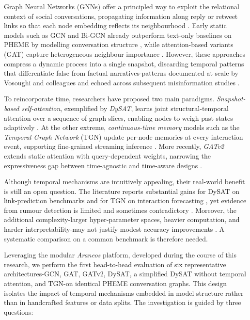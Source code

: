 \documentclass{cshonours}
\begin{document}
Graph Neural Networks (GNNs) offer a principled way to exploit the relational context of social conversations, propagating information along reply or retweet links so that each node embedding reflects its neighbourhood \cite{kipf2017semi}.  Early static models such as GCN and Bi-GCN already outperform text-only baselines on PHEME by modelling conversation structure \cite{bian2020rumor}, while attention-based variants (GAT) capture heterogeneous neighbour importance \cite{lv2022rumor}.  However, these approaches compress a dynamic process into a single snapshot, discarding temporal patterns that differentiate false from factual narratives-patterns documented at scale by Vosoughi and colleagues \cite{vosoughi2018spread} and echoed across subsequent misinformation studies \cite{survey2024disinfo}.


To reincorporate time, researchers have proposed two main paradigms.  \emph{Snapshot-based self-attention}, exemplified by \emph{DySAT}, learns joint structural-temporal attention over a sequence of graph slices, enabling nodes to weigh past states adaptively \cite{sankar2020dysat}.  At the other extreme, \emph{continuous-time memory} models such as the \emph{Temporal Graph Network} (TGN) update per-node memories at every interaction event, supporting fine-grained streaming inference \cite{rossi2020tgn}.  More recently, \emph{GATv2} extends static attention with query-dependent weights, narrowing the expressiveness gap between time-agnostic and time-aware designs \cite{brody2022gatv2}.


Although temporal mechanisms are intuitively appealing, their real-world benefit is still an open question.  The literature reports substantial gains for DySAT on link-prediction benchmarks \cite{sankar2020dysat} and for TGN on interaction forecasting \cite{rossi2020tgn}, yet evidence from rumour detection is limited and sometimes contradictory \cite{liu2024rumor}.  Moreover, the additional complexity-larger hyper-parameter spaces, heavier computation, and harder interpretability-may not justify modest accuracy improvements \cite{survey2024disinfo}.  A systematic comparison on a common benchmark is therefore needed.


Leveraging the modular \emph{Araneos} platform, developed during the course of this research, we perform the first head-to-head evaluation of six representative architectures-GCN, GAT, GATv2, DySAT, a simplified DySAT without temporal attention, and TGN-on identical PHEME conversation graphs.  This design isolates the impact of temporal mechanisms embedded in model structure rather than in handcrafted features or data splits.  The investigation is guided by three questions:
\end{document}
